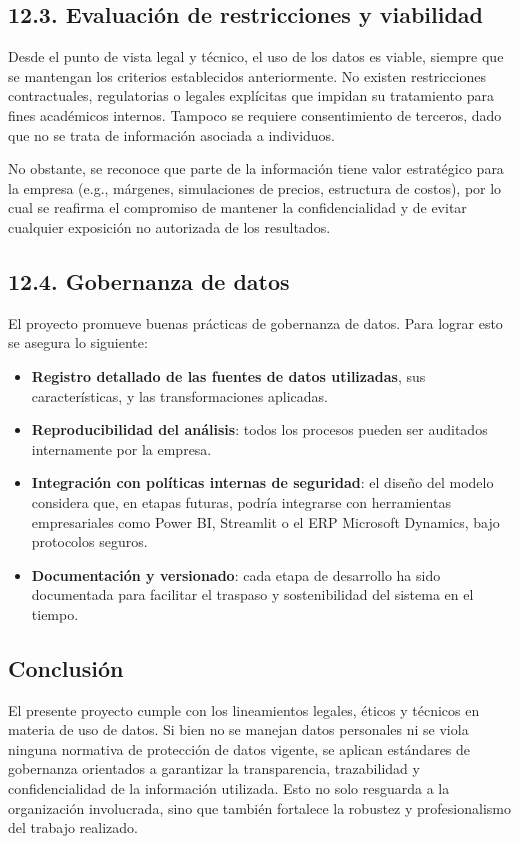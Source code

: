 \documentclass[
11pt, %
]{charter}
\begin{document}
\subsection*{12.3. Evaluación de restricciones y viabilidad}

Desde el punto de vista legal y técnico, el uso de los datos es viable, siempre que se mantengan los criterios establecidos anteriormente. No existen restricciones contractuales, regulatorias o legales explícitas que impidan su tratamiento para fines académicos internos. Tampoco se requiere consentimiento de terceros, dado que no se trata de información asociada a individuos.

No obstante, se reconoce que parte de la información tiene valor estratégico para la empresa (e.g., márgenes, simulaciones de precios, estructura de costos), por lo cual se reafirma el compromiso de mantener la confidencialidad y de evitar cualquier exposición no autorizada de los resultados.

\subsection*{12.4. Gobernanza de datos}

El proyecto promueve buenas prácticas de gobernanza de datos. Para lograr esto se asegura lo siguiente:

\begin{itemize}
  \item \textbf{Registro detallado de las fuentes de datos utilizadas}, sus características, y las transformaciones aplicadas.
  \item \textbf{Reproducibilidad del análisis}: todos los procesos pueden ser auditados internamente por la empresa.
  \item \textbf{Integración con políticas internas de seguridad}: el diseño del modelo considera que, en etapas futuras, podría integrarse con herramientas empresariales como Power BI, Streamlit o el ERP Microsoft Dynamics, bajo protocolos seguros.
  \item \textbf{Documentación y versionado}: cada etapa de desarrollo ha sido documentada para facilitar el traspaso y sostenibilidad del sistema en el tiempo.
\end{itemize}

\subsection*{Conclusión}

El presente proyecto cumple con los lineamientos legales, éticos y técnicos en materia de uso de datos. Si bien no se manejan datos personales ni se viola ninguna normativa de protección de datos vigente, se aplican estándares de gobernanza orientados a garantizar la transparencia, trazabilidad y confidencialidad de la información utilizada. Esto no solo resguarda a la organización involucrada, sino que también fortalece la robustez y profesionalismo del trabajo realizado.
\end{document}
